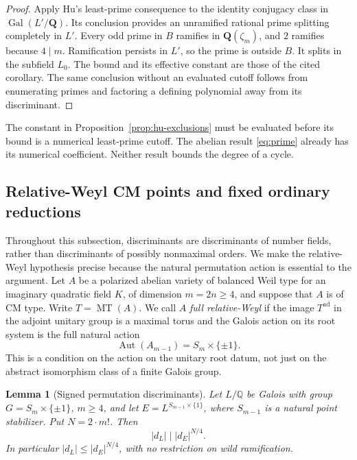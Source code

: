 \documentclass[11pt]{article}
\newtheorem{lemma}[theorem]{Lemma}
\theoremstyle{definition}
\theoremstyle{remark}
\begin{document}
\begin{proof}
Apply Hu's least-prime consequence to the identity conjugacy
class in $\operatorname{Gal}(L'/\mathbf Q)$.  Its conclusion
provides an unramified rational prime splitting completely in
$L'$.  Every odd prime in $B$ ramifies in
$\mathbf Q(\zeta_m)$, and $2$ ramifies because $4\mid m$.
Ramification persists in $L'$, so the prime is outside $B$.
It splits in the subfield $L_0$.  The bound and its effective
constant are those of the cited corollary.  The same conclusion
without an evaluated cutoff follows from enumerating primes and
factoring a defining polynomial away from its discriminant.
\end{proof}

The constant in Proposition~\ref{prop:hu-exclusions} must be
evaluated before its bound is a numerical least-prime cutoff.
The abelian result \eqref{eq:prime} already has its numerical
coefficient.  Neither result bounds the degree of a cycle.


\subsection{Relative-Weyl CM points and fixed ordinary reductions}
\label{subsec:weyl-ordinary-rigidity}

Throughout this subsection, discriminants are discriminants of number
fields, rather than discriminants of possibly nonmaximal orders.
We make the relative-Weyl hypothesis precise because the natural
permutation action is essential to the argument.
Let $A$ be a polarized abelian variety of balanced Weil type for an
imaginary quadratic field $K$, of dimension $m=2n\geq4$, and suppose
that $A$ is of CM type.  Write $T=\operatorname{MT}(A)$.
We call $A$ \emph{full relative-Weyl} if the image $T^{\mathrm{ad}}$
in the adjoint unitary group is a maximal torus and the Galois action
on its root system is the full natural action
\[
 \operatorname{Aut}(A_{m-1})=S_m\times\{\pm1\}.
\]
This is a condition on the action on the unitary root datum, not just
on the abstract isomorphism class of a finite Galois group.

\begin{lemma}[Signed permutation discriminants]
\label{lem:weyl-signed-discriminant}
Let $L/\mathbb Q$ be Galois with group
$G=S_m\times\{\pm1\}$, $m\geq4$, and let
$E=L^{S_{m-1}\times\{1\}}$, where $S_{m-1}$ is a natural point
stabilizer.  Put $N=2\cdot m!$.
Then
\begin{equation}
 \label{eq:weyl-discriminant-divisibility}
 |d_L|\mid |d_E|^{N/4}.
\end{equation}
In particular $|d_L|\leq |d_E|^{N/4}$, with no restriction on wild
ramification.
\end{lemma}
\end{document}
